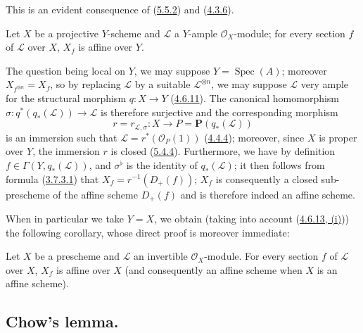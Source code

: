 This is an evident consequence of (\hyperref[II.5.5.2]{5.5.2}) and
(\hyperref[II.4.3.6]{4.3.6}).

\begin{proposition}[5.5.7]
\label{II.5.5.7}
Let $X$ be a projective $Y$-scheme and $\mathcal{L}$ a $Y$-ample
$\mathcal{O}_X$-module; for every section $f$ of $\mathcal{L}$ over $X$,
$X_f$ is affine over $Y$.
\end{proposition}


The question being local on $Y$, we may suppose
$Y=\operatorname{Spec}(A)$; moreover
$X_{f^{\otimes n}}=X_f$, so by replacing $\mathcal{L}$ by a suitable
$\mathcal{L}^{\otimes n}$, we may suppose $\mathcal{L}$ very
ample for the structural morphism $q:X\to Y$
(\hyperref[II.4.6.11]{4.6.11}). The canonical homomorphism
$\sigma:q^*(q_*(\mathcal{L}))\to\mathcal{L}$ is therefore surjective and
the corresponding morphism
\[
r=r_{\mathcal{L},\sigma}:X\to P=\mathbf{P}(q_*(\mathcal{L}))
\]
is an immersion such that $\mathcal{L}=r^*(\mathcal{O}_P(1))$
(\hyperref[II.4.4.4]{4.4.4}); moreover, since $X$ is proper over $Y$,
the immersion $r$ is closed (\hyperref[II.5.4.4]{5.4.4}). Furthermore, we
have by definition $f\in\Gamma(Y,q_*(\mathcal{L}))$, and $\sigma^\flat$ is
the identity of $q_*(\mathcal{L})$; it then follows from formula
(\hyperref[II.3.7.3.1]{3.7.3.1}) that $X_f=r^{-1}(D_+(f))$; $X_f$
is consequently a closed sub-prescheme of the affine scheme $D_+(f)$ and is
therefore indeed an affine scheme.

When in particular we take $Y=X$, we obtain (taking into account
(\hyperref[II.4.6.13]{4.6.13, (i)})) the following corollary, whose
direct proof is moreover immediate:

\begin{corollary}[5.5.8]
\label{II.5.5.8}
Let $X$ be a prescheme and $\mathcal{L}$ an invertible $\mathcal{O}_X$-module.
For every section $f$ of $\mathcal{L}$ over $X$, $X_f$ is affine
over $X$ (and consequently an affine scheme when $X$ is an affine scheme).
\end{corollary}

\subsection{Chow's lemma.}
\label{subsection:II.5.6}

